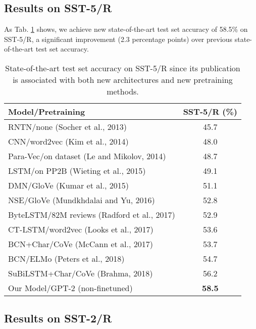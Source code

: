 \documentclass[11pt,a4paper]{article}
\begin{document}
\subsection{Results on SST-5/R}

As Tab. \ref{tab:SST5R} shows, we achieve new state-of-the-art test set accuracy of 58.5\% on SST-5/R, a significant improvement (2.3 percentage points) over previous state-of-the-art test set accuracy.

\begin{table}[h]
	\small
	\begin{center}
		\begin{tabular}{@{}lc@{}}
			\toprule
			\bf Model/Pretraining & \bf SST-5/R (\%) \\
			\midrule
			RNTN/{\scriptsize none} (Socher et al., 2013) & 45.7 \\
			CNN/{\scriptsize word2vec} (Kim et al., 2014) & 48.0 \\
			Para-Vec/{\scriptsize on dataset} (Le and Mikolov, 2014) & 48.7 \\
			LSTM/{\scriptsize on PP2B} (Wieting et al., 2015) & 49.1 \\
			DMN/{\scriptsize GloVe} (Kumar et al., 2015) & 51.1 \\
			NSE/{\scriptsize GloVe} (Mundkhdalai and Yu, 2016) & 52.8 \\
			ByteLSTM/{\scriptsize 82M reviews} (Radford et al., 2017) & 52.9 \\
			CT-LSTM/{\scriptsize word2vec} (Looks et al., 2017) & 53.6 \\
			BCN+Char/{\scriptsize CoVe} (McCann et al., 2017) & 53.7 \\
			BCN/{\scriptsize ELMo} (Peters et al., 2018) & 54.7 \\
			SuBiLSTM+Char/{\scriptsize CoVe} (Brahma, 2018) & 56.2 \\
			Our Model/{\scriptsize GPT-2 (non-finetuned)} & \bf 58.5 \\
			\bottomrule
		\end{tabular}
	\end{center}
	\caption{\label{tab:SST5R}State-of-the-art test set accuracy on SST-5/R since its publication is associated with both new architectures and new pretraining methods.}
\end{table}

\subsection{Results on SST-2/R}
\end{document}
